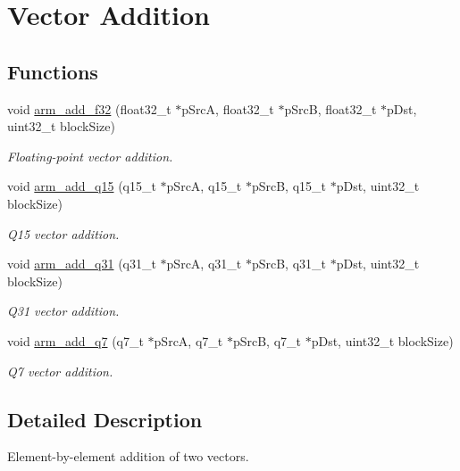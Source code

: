 \hypertarget{group__BasicAdd}{}\section{Vector Addition}
\label{group__BasicAdd}
\subsection*{Functions}
\begin{DoxyCompactItemize}
\item 
void \hyperlink{group__BasicAdd_ga6a904a547413b10565dd1d251c6bafbd}{arm\+\_\+add\+\_\+f32} (float32\+\_\+t $\ast$p\+SrcA, float32\+\_\+t $\ast$p\+SrcB, float32\+\_\+t $\ast$p\+Dst, uint32\+\_\+t block\+Size)
\begin{DoxyCompactList}\small\item\em Floating-\/point vector addition. \end{DoxyCompactList}\item 
void \hyperlink{group__BasicAdd_gabb51285a41f511670bbff62fc0e1bf62}{arm\+\_\+add\+\_\+q15} (q15\+\_\+t $\ast$p\+SrcA, q15\+\_\+t $\ast$p\+SrcB, q15\+\_\+t $\ast$p\+Dst, uint32\+\_\+t block\+Size)
\begin{DoxyCompactList}\small\item\em Q15 vector addition. \end{DoxyCompactList}\item 
void \hyperlink{group__BasicAdd_ga24d6c3f7f8b9fae4847c0c3f26a39a3b}{arm\+\_\+add\+\_\+q31} (q31\+\_\+t $\ast$p\+SrcA, q31\+\_\+t $\ast$p\+SrcB, q31\+\_\+t $\ast$p\+Dst, uint32\+\_\+t block\+Size)
\begin{DoxyCompactList}\small\item\em Q31 vector addition. \end{DoxyCompactList}\item 
void \hyperlink{group__BasicAdd_gaed633f415a7840a66861debca2dfb96b}{arm\+\_\+add\+\_\+q7} (q7\+\_\+t $\ast$p\+SrcA, q7\+\_\+t $\ast$p\+SrcB, q7\+\_\+t $\ast$p\+Dst, uint32\+\_\+t block\+Size)
\begin{DoxyCompactList}\small\item\em Q7 vector addition. \end{DoxyCompactList}\end{DoxyCompactItemize}


\subsection{Detailed Description}
Element-\/by-\/element addition of two vectors.


